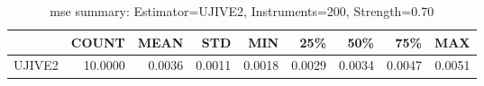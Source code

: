 \begin{table}[ht]
\centering
\caption{mse summary: Estimator=UJIVE2, Instruments=200, Strength=0.70}
\begin{tabular}{lrrrrrrrr}
\toprule
 & COUNT & MEAN & STD & MIN & 25\% & 50\% & 75\% & MAX \\
\midrule
UJIVE2 & 10.0000 & 0.0036 & 0.0011 & 0.0018 & 0.0029 & 0.0034 & 0.0047 & 0.0051 \\
\bottomrule
\end{tabular}
\end{table}

